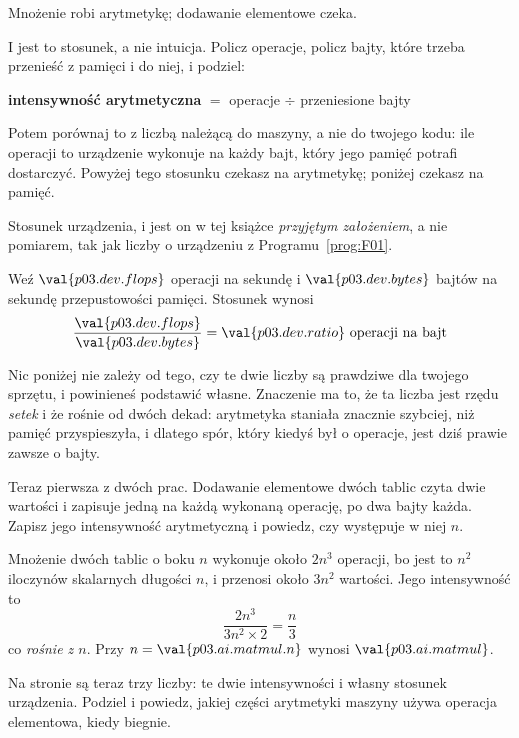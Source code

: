 \begin{fr}
\begin{ansblock}
Mnożenie robi arytmetykę; dodawanie elementowe czeka.
\end{ansblock}

I jest to stosunek, a nie intuicja. Policz operacje, policz bajty, które trzeba
przenieść z pamięci i do niej, i podziel:

\medskip
\noindent
\textbf{intensywność arytmetyczna} $=$ operacje $\div$ przeniesione bajty

\medskip
\noindent
Potem porównaj to z liczbą należącą do maszyny, a nie do twojego kodu: ile
operacji to urządzenie wykonuje na każdy bajt, który jego pamięć potrafi
dostarczyć. Powyżej tego stosunku czekasz na arytmetykę; poniżej czekasz na
pamięć.
\end{fr}


\begin{fr}
Stosunek urządzenia, i jest on w tej książce \emph{przyjętym założeniem}, a nie
pomiarem, tak jak liczby o urządzeniu z Programu~\ref{prog:F01}.

Weź $\val{p03.dev.flops}$ operacji na sekundę i $\val{p03.dev.bytes}$ bajtów na
sekundę przepustowości pamięci. Stosunek wynosi
\[ \frac{\val{p03.dev.flops}}{\val{p03.dev.bytes}}
   = \val{p03.dev.ratio} \text{ operacji na bajt} \]

Nic poniżej nie zależy od tego, czy te dwie liczby są prawdziwe dla twojego
sprzętu, i powinieneś podstawić własne. Znaczenie ma to, że ta liczba jest
rzędu \emph{setek} i że rośnie od dwóch dekad: arytmetyka staniała znacznie
szybciej, niż pamięć przyspieszyła, i dlatego spór, który kiedyś był o
operacje, jest dziś prawie zawsze o bajty.

Teraz pierwsza z dwóch prac. Dodawanie elementowe dwóch tablic czyta dwie
wartości i zapisuje jedną na każdą wykonaną operację, po dwa bajty każda.
Zapisz jego intensywność arytmetyczną i powiedz, czy występuje w niej $n$.
\dotline
\nextframe
\end{fr}

\begin{fr}

Mnożenie dwóch tablic o boku $n$ wykonuje około $2n^{3}$ operacji, bo jest to
$n^{2}$ iloczynów skalarnych długości $n$, i przenosi około $3n^{2}$ wartości.
Jego intensywność to
\[ \frac{2n^{3}}{3n^{2} \times 2} = \frac{n}{3} \]
co \emph{rośnie z $n$}. Przy $n = \val{p03.ai.matmul.n}$ wynosi
$\val{p03.ai.matmul}$.

Na stronie są teraz trzy liczby: te dwie intensywności i własny stosunek
urządzenia. Podziel i powiedz, jakiej części arytmetyki maszyny używa operacja
elementowa, kiedy biegnie.
\dotline
\nextframe
\end{fr}

